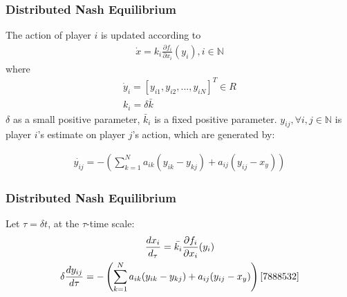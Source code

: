 \documentclass[notheorems, aspectratio=54]{beamer}
\begin{document}
\begin{frame}
  \frametitle{Distributed Nash Equilibrium}

  The action of player $i$ is updated according to\newline
  \begin{gather}
    \dot{x} = k_i \frac {\partial f_i}{\partial x_i}(y_i), i \in \mathbb{N} 
  \end{gather}
  where
   \begin{gather}
     \dot{y}_i = [y_{i1}, y_{i2},...,y_{iN}]^T \in R \nonumber \\
     k_i = \delta \bar{k} \nonumber
   \end{gather}
   $\delta$ as a small positive parameter, $\bar{k}_i$ is a fixed positive parameter.\newline
   $y_{ij}, \forall i, j \in \mathbb{N}$ is player $i$'s estimate on player $j$'s action, which are generated by:\newline

   \begin{gather}
     \dot{y_{ij}}=-\left(\sum_{k=1}^N a_{ik}(y_{ik}-y_{kj})+a_{ij}(y_{ij}-x_y)\right) \nonumber
   \end{gather}

\end{frame}

\begin{frame}
  \frametitle{Distributed Nash Equilibrium}
  Let $\tau=\delta t$, at the $\tau$-time scale:\newline
  \begin{gather}
    \frac{dx_i}{d_{\tau}}=\bar{k_i}\frac{\partial f_i}{\partial x_i}(y_i)\nonumber\\
    \delta \frac{dy_{ij}}{d\tau}=-\left(\sum_{k=1}^N a_{ik}(y_{ik}-y_{kj})+a_{ij}(y_{ij}-x_y)\right)  \cite{7888532}
  \end{gather}
\end{frame}
\end{document}
